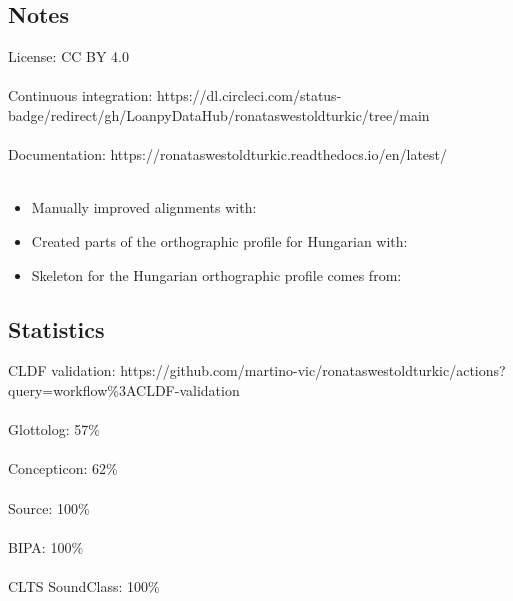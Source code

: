 \documentclass[letterpaper,10pt,english]{sphinxmanual}
\begin{document}
\subsection{Notes}
\label{\detokenize{home:notes}}
\sphinxAtStartPar
License: CC BY 4.0\\\\
 Continuous integration: https://dl.circleci.com/status-badge/redirect/gh/LoanpyDataHub/ronataswestoldturkic/tree/main\\\\
 Documentation: https://ronataswestoldturkic.readthedocs.io/en/latest/\\\\

\begin{itemize}
\item {} 
\sphinxAtStartPar
Manually improved alignments with: 

\item {} 
\sphinxAtStartPar
Created parts of the orthographic profile for Hungarian with:

\item {} 
\sphinxAtStartPar
Skeleton for the Hungarian orthographic profile comes from:

\end{itemize}


\subsection{Statistics}
\label{\detokenize{home:statistics}}
\sphinxAtStartPar
CLDF validation: https://github.com/martino-vic/ronataswestoldturkic/actions?query=workflow\%3ACLDF-validation\\\\
 Glottolog: 57\%\\\\
 Concepticon: 62\%\\\\
 Source: 100\%\\\\
BIPA: 100\%\\\\
 CLTS SoundClass: 100\%\\\\
\end{document}
